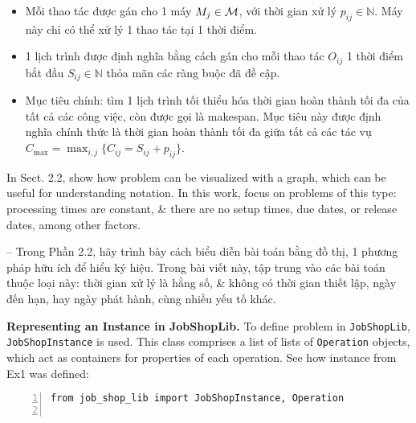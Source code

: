 \documentclass{article}
\begin{document}
\begin{itemize}
\begin{itemize}
        \item Mỗi thao tác được gán cho 1 máy $M_j\in{\cal M}$, với thời gian xử lý $p_{ij}\in\mathbb{N}$. Máy này chỉ có thể xử lý 1 thao tác tại 1 thời điểm.
        \item 1 lịch trình được định nghĩa bằng cách gán cho mỗi thao tác $O_{ij}$ 1 thời điểm bắt đầu $S_{ij}\in\mathbb{N}$ thỏa mãn các ràng buộc đã đề cập.
        \item Mục tiêu chính: tìm 1 lịch trình tối thiểu hóa thời gian hoàn thành tối đa của tất cả các công việc, còn được gọi là makespan. Mục tiêu này được định nghĩa chính thức là thời gian hoàn thành tối đa giữa tất cả các tác vụ $C_{\max} = \max_{i,j}\{C_{ij} = S_{ij} + p_{ij}\}$.
    \end{itemize}
    In Sect. 2.2, show how problem can be visualized with a graph, which can be useful for understanding notation. In this work, focus on problems of this type: processing times are constant, \& there are no setup times, due dates, or release dates, among other factors.

    -- Trong Phần 2.2, hãy trình bày cách biểu diễn bài toán bằng đồ thị, 1 phương pháp hữu ích để hiểu ký hiệu. Trong bài viết này, tập trung vào các bài toán thuộc loại này: thời gian xử lý là hằng số, \& không có thời gian thiết lập, ngày đến hạn, hay ngày phát hành, cùng nhiều yếu tố khác.

    {\bf Representing an Instance in JobShopLib.} To define problem in {\tt JobShopLib}, {\tt JobShopInstance} is used. This class comprises a list of lists of {\tt Operation} objects, which act as containers for properties of each operation. See how instance from Ex1 was defined:
    \begin{Verbatim}[numbers=left,xleftmargin=5mm]
from job_shop_lib import JobShopInstance, Operation


\end{Verbatim}
\end{itemize}
\end{document}
